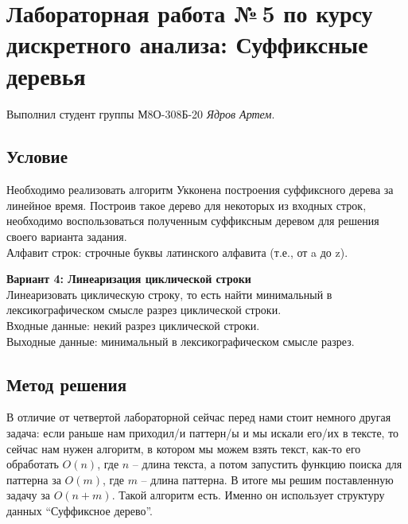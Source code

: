 \documentclass[12pt]{article}
\begin{document}
	
	\section*{Лабораторная работа №\,5 по курсу дискретного анализа: Суффиксные деревья}
	
	Выполнил студент группы М8О-308Б-20 \textit{Ядров Артем}.
	
	\subsection*{Условие}
	
	Необходимо реализовать алгоритм Укконена построения суффиксного
	дерева за линейное время. Построив такое дерево для некоторых из
	входных строк, необходимо воспользоваться полученным суффиксным
	деревом для решения своего варианта задания.\\
	Алфавит строк: строчные буквы латинского алфавита (т.е., от a до z).
	
	\textbf{Вариант 4: Линеаризация циклической строки}\\
	Линеаризовать циклическую строку, то есть найти минимальный в
	лексикографическом смысле разрез циклической строки.\\
	Входные данные: некий разрез циклической строки.\\
	Выходные данные: минимальный в лексикографическом смысле разрез.
	
	\subsection*{Метод решения}
	
В отличие от четвертой лабораторной сейчас перед нами стоит немного другая задача:
если раньше нам приходил/и паттерн/ы и мы искали его/их в тексте, то сейчас нам нужен
алгоритм, в котором мы можем взять текст, как-то его обработать $O(n)$, где $n$ – длина
текста, а потом запустить функцию поиска для паттерна за $O(m)$, где $m$ – длина паттерна. В
итоге мы решим поставленную задачу за $O(n+m)$. Такой алгоритм есть. Именно он
использует структуру данных “Суффиксное дерево”.
\end{document}

